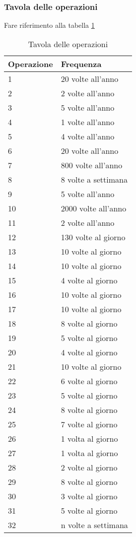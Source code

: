 \documentclass{article}
\begin{document}
\subsubsection{Tavola delle operazioni}
Fare riferimento alla tabella \ref{table_operazioni}

\begin{table}
\centering
\begin{tabularx}{\textwidth}{|X|X|}
\hline 
\textbf{Operazione} & \textbf{Frequenza} \\ \hline
1 & 20 volte all'anno \\ \hline
2 & 2 volte all'anno \\ \hline
3 & 5 volte all'anno \\ \hline
4 & 1 volte all'anno \\ \hline
5 & 4 volte all'anno \\ \hline
6 & 20 volte all'anno \\ \hline
7 & 800 volte all'anno \\ \hline
8 & 8 volte a settimana \\ \hline
9 & 5 volte all'anno \\ \hline
10 & 2000 volte all'anno \\ \hline
11 & 2 volte all'anno \\ \hline
12 & 130 volte al giorno \\ \hline
13 & 10 volte al giorno \\ \hline
14 & 10 volte al giorno \\ \hline
15 & 4 volte al giorno \\ \hline
16 & 10 volte al giorno \\ \hline
17 & 10 volte al giorno \\ \hline
18 & 8 volte al giorno \\ \hline
19 & 5 volte al giorno \\ \hline
20 & 4 volte al giorno \\ \hline
21 & 10 volte al giorno \\ \hline
22 & 6 volte al giorno \\ \hline
23 & 5 volte al giorno \\ \hline
24 & 8 volte al giorno \\ \hline
25 & 7 volte al giorno \\ \hline
26 & 1 volta al giorno \\ \hline
27 & 1 volta al giorno \\ \hline
28 & 2 volte al giorno \\ \hline
29 & 8 volte al giorno \\ \hline
30 & 3 volte al giorno \\ \hline
31 & 5 volte al giorno \\ \hline
32 & n volte a settimana \\ \hline
\end{tabularx}
\caption{Tavola delle operazioni}
\label{table_operazioni}
\end{table}
\end{document}
